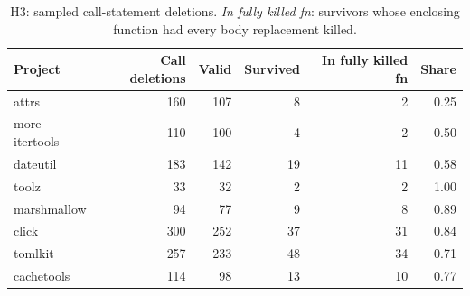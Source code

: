 \begin{table}[t]
\centering\small
\begin{tabular}{lrrrrr}
\toprule
Project & Call deletions & Valid & Survived & In fully killed fn & Share \\
\midrule
attrs & 160 & 107 & 8 & 2 & 0.25 \\
more-itertools & 110 & 100 & 4 & 2 & 0.50 \\
dateutil & 183 & 142 & 19 & 11 & 0.58 \\
toolz & 33 & 32 & 2 & 2 & 1.00 \\
marshmallow & 94 & 77 & 9 & 8 & 0.89 \\
click & 300 & 252 & 37 & 31 & 0.84 \\
tomlkit & 257 & 233 & 48 & 34 & 0.71 \\
cachetools & 114 & 98 & 13 & 10 & 0.77 \\
\bottomrule
\end{tabular}
\caption{H3: sampled call-statement deletions. \emph{In fully killed fn}: survivors whose enclosing function had every body replacement killed.}
\label{tab:h3}
\end{table}
